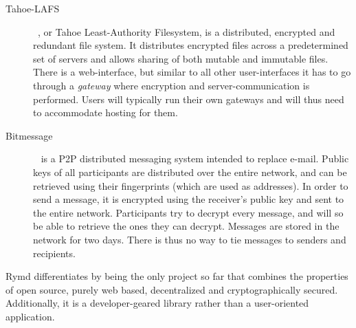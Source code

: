 \begin{description}
  \item[Tahoe-LAFS]~\cite{Tahoe:2014:Online}, or Tahoe Least-Authority Filesystem, is a distributed, encrypted and redundant file system. It distributes encrypted files across a predetermined set of servers and allows sharing of both mutable and immutable files. There is a web-interface, but similar to all other user-interfaces it has to go through a \emph{gateway} where encryption and server-communication is performed. Users will typically run their own gateways and will thus need to accommodate hosting for them.
  \item[Bitmessage]~\cite{Bitmessage:2014:Online} is a P2P distributed messaging system intended to replace e-mail. Public keys of all participants are distributed over the entire network, and can be retrieved using their fingerprints (which are used as addresses). In order to send a message, it is encrypted using the receiver's public key and sent to the entire network. Participants try to decrypt every message, and will so be able to retrieve the ones they can decrypt. Messages are stored in the network for two days. There is thus no way to tie messages to senders and recipients.

\end{description}

Rymd differentiates by being the only project so far that combines the properties of open source, purely web based, decentralized and cryptographically secured. Additionally, it is a developer-geared library rather than a user-oriented application.
